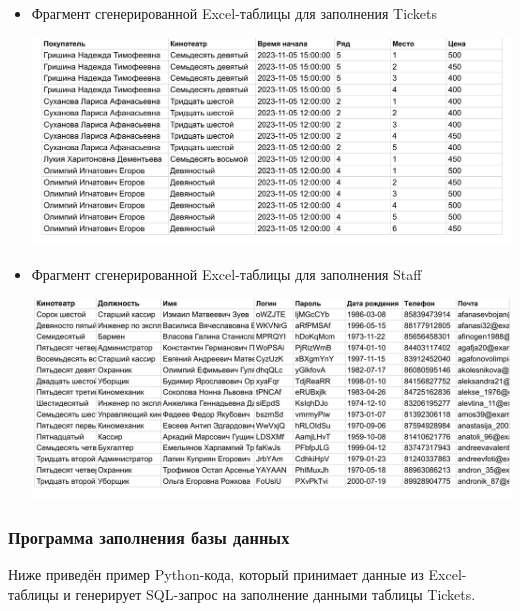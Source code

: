 \documentclass[a4paper,12pt]{article}
\renewcommand{\^}[2]{#1^{\, #2} \kern -1pt}
\newcommand{\1}{\kern 1pt}
\newcommand{\0}{\kern -1pt}
\begin{document}
\begin{itemize}
	
	\item Фрагмент сгенерированной Excel-таблицы для заполнения Tickets
	
	\includegraphics[scale=0.7,page=1]{table_inserts_excel/tickets_random}
	
	
	\item Фрагмент сгенерированной Excel-таблицы для заполнения Staff
	
	\includegraphics[scale=0.7,page=1]{table_inserts_excel/staff_random}
	
	\end{itemize}
	
	\newpage
	
	\subsubsection{Программа заполнения базы данных}
	
	Ниже приведён пример Python-кода, который принимает данные из Excel-таблицы и генерирует SQL-запрос на заполнение данными таблицы Tickets.
	
\end{document}
